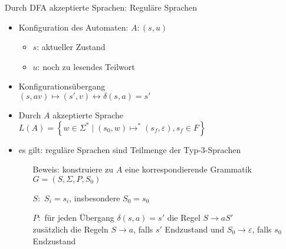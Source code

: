 \begin{frame}{Durch DFA akzeptierte Sprachen: Reguläre Sprachen}
	\begin{itemize}
		\item Konfiguration des Automaten: $A: (s,u)$
		\begin{itemize}
			\item $s$: aktueller Zustand
			\item $u$: noch zu lesendes Teilwort
		\end{itemize}
		\item Konfigurationsübergang\\
		\quad $(s, av) \mapsto (s', v) \leftrightarrow \delta(s,a) = s'$
		\item Durch $A$ akzeptierte Sprache\\
		\quad $L(A) = \left\{w \in \Sigma^* \mid (s_0,w) \mapsto^* (s_f, \varepsilon), s_f \in F \right\}$
		\item es gilt: reguläre Sprachen sind Teilmenge der Typ-3-Sprachen\\
		\begin{itemize}
			\item[Beweis:] konstruiere zu $A$ eine korrespondierende Grammatik $G=(S,\Sigma,P,S_0)$\\
			\item[$S:$] $S_i=s_i$, insbesondere $S_0=s_0$
			\item[$P:$] für jeden Übergang $\delta(s,a)=s'$ die Regel $S \rightarrow aS'$\\
			zusätzlich die Regeln $S \rightarrow a$, falls $s'$ Endzustand und $S_0 \rightarrow \varepsilon$, falls $s_0$ Endzustand
		\end{itemize}
	\end{itemize}
\end{frame}

